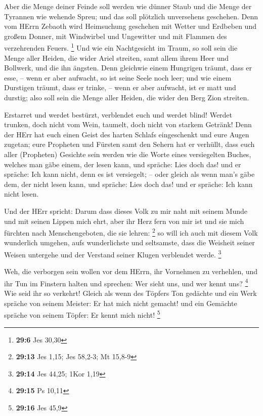  Aber die Menge deiner Feinde soll werden wie dünner Staub
und die Menge der Tyrannen wie wehende Spreu; und das soll plötzlich
unversehens geschehen.  Denn vom HErrn Zebaoth wird
Heimsuchung geschehen mit Wetter und Erdbeben und großem Donner, mit
Windwirbel und Ungewitter und mit Flammen des verzehrenden Feuers.
\footnote{\textbf{29:6} Jes 30,30}  Und wie ein Nachtgesicht
im Traum, so soll sein die Menge aller Heiden, die wider Ariel streiten,
samt allem ihrem Heer und Bollwerk, und die ihn ängsten. 
Denn gleichwie einem Hungrigen träumt, dass er esse, -- wenn er aber
aufwacht, so ist seine Seele noch leer; und wie einem Durstigen träumt,
dass er trinke, -- wenn er aber aufwacht, ist er matt und durstig; also
soll sein die Menge aller Heiden, die wider den Berg Zion streiten.

 Erstarret und werdet bestürzt, verblendet euch und werdet
blind! Werdet trunken, doch nicht vom Wein, taumelt, doch nicht von
starkem Getränk!  Denn der HErr hat euch einen Geist des
harten Schlafs eingeschenkt und eure Augen zugetan; eure Propheten und
Fürsten samt den Sehern hat er verhüllt,  dass euch aller
(Propheten) Gesichte sein werden wie die Worte eines versiegelten
Buches, welches man gäbe einem, der lesen kann, und spräche: Lies doch
das! und er spräche: Ich kann nicht, denn es ist versiegelt; --
 oder gleich als wenn man's gäbe dem, der nicht lesen kann,
und spräche: Lies doch das! und er spräche: Ich kann nicht lesen.

 Und der HErr spricht: Darum dass dieses Volk zu mir naht
mit seinem Munde und mit seinen Lippen mich ehrt, aber ihr Herz fern von
mir ist und sie mich fürchten nach Menschengeboten, die sie lehren:
\footnote{\textbf{29:13} Jes 1,15; Jes 58,2-3; Mt 15,8-9} 
so will ich auch mit diesem Volk wunderlich umgehen, aufs wunderlichste
und seltsamste, dass die Weisheit seiner Weisen untergehe und der
Verstand seiner Klugen verblendet werde. \footnote{\textbf{29:14} Jes
  44,25; 1Kor 1,19}

 Weh, die verborgen sein wollen vor dem HErrn, ihr
Vornehmen zu verhehlen, und ihr Tun im Finstern halten und sprechen: Wer
sieht uns, und wer kennt uns? \footnote{\textbf{29:15} Ps 10,11}
 Wie seid ihr so verkehrt! Gleich als wenn des Töpfers Ton
gedächte und ein Werk spräche von seinem Meister: Er hat mich nicht
gemacht! und ein Gemächte spräche von seinem Töpfer: Er kennt mich
nicht! \footnote{\textbf{29:16} Jes 45,9}

